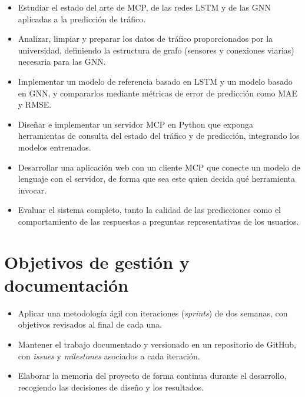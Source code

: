 \begin{itemize}
  \item Estudiar el estado del arte de MCP, de las redes LSTM y de las GNN aplicadas a la predicción de tráfico.
  \item Analizar, limpiar y preparar los datos de tráfico proporcionados por la universidad, definiendo la estructura de grafo (sensores y conexiones viarias) necesaria para las GNN.
  \item Implementar un modelo de referencia basado en LSTM y un modelo basado en GNN, y compararlos mediante métricas de error de predicción como MAE y RMSE.
  \item Diseñar e implementar un servidor MCP en Python que exponga herramientas de consulta del estado del tráfico y de predicción, integrando los modelos entrenados.
  \item Desarrollar una aplicación web con un cliente MCP que conecte un modelo de lenguaje con el servidor, de forma que sea este quien decida qué herramienta invocar.
  \item Evaluar el sistema completo, tanto la calidad de las predicciones como el comportamiento de las respuestas a preguntas representativas de los usuarios.
\end{itemize}

\section{Objetivos de gestión y documentación}

\begin{itemize}
  \item Aplicar una metodología ágil con iteraciones (\textit{sprints}) de dos semanas, con objetivos revisados al final de cada una.
  \item Mantener el trabajo documentado y versionado en un repositorio de GitHub, con \textit{issues} y \textit{milestones} asociados a cada iteración.
  \item Elaborar la memoria del proyecto de forma continua durante el desarrollo, recogiendo las decisiones de diseño y los resultados.
\end{itemize}
